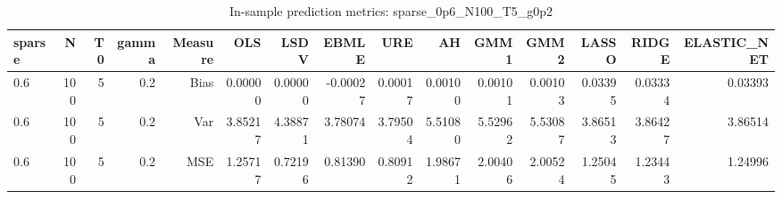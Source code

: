 \begin{table}[!htbp]\centering
\caption{In-sample prediction metrics: sparse_0p6_N100_T5_g0p2}
\label{tab:table2_sparse_0p6_N100_T5_g0p2}
\begin{tabular}{lrrrrrrrrrrrrrr}
\hline
sparse & N & T0 & gamma & Measure & OLS & LSDV & EBMLE & URE & AH & GMM1 & GMM2 & LASSO & RIDGE & ELASTIC_NET \\
\hline
0.6 & 100 & 5 & 0.2 & Bias & 0.00000 & 0.00000 & -0.00027 & 0.00017 & 0.00100 & 0.00101 & 0.00103 & 0.03395 & 0.03334 & 0.03393 \\
0.6 & 100 & 5 & 0.2 & Var & 3.85217 & 4.38871 & 3.78074 & 3.79504 & 5.51080 & 5.52962 & 5.53087 & 3.86513 & 3.86427 & 3.86514 \\
0.6 & 100 & 5 & 0.2 & MSE & 1.25717 & 0.72196 & 0.81390 & 0.80912 & 1.98671 & 2.00406 & 2.00524 & 1.25045 & 1.23443 & 1.24996 \\
\hline
\end{tabular}
\end{table}


